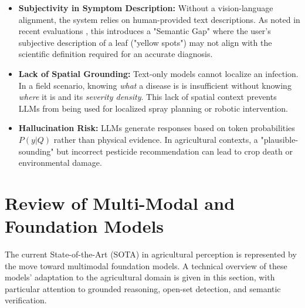 \begin{itemize}
	\item \textbf{Subjectivity in Symptom Description:} Without a vision-language alignment, the system relies on human-provided text descriptions. As noted in recent evaluations \cite{kasneci2023chatgpt}, this introduces a "Semantic Gap" where the user's subjective description of a leaf ("yellow spots") may not align with the scientific definition required for an accurate diagnosis.
	\item \textbf{Lack of Spatial Grounding:} Text-only models cannot localize an infection. In a field scenario, knowing \textit{what} a disease is is insufficient without knowing \textit{where} it is and its \textit{severity density}. This lack of spatial context prevents LLMs from being used for localized spray planning or robotic intervention.
	\item \textbf{Hallucination Risk:} LLMs generate responses based on token probabilities $P(y|Q)$ rather than physical evidence. In agricultural contexts, a "plausible-sounding" but incorrect pesticide recommendation can lead to crop death or environmental damage.
\end{itemize}

\section{Review of Multi-Modal and Foundation Models}

The current State-of-the-Art (SOTA) in agricultural perception is represented by the move toward multimodal foundation models. A technical overview of these models' adaptation to the agricultural domain is given in this section, with particular attention to grounded reasoning, open-set detection, and semantic verification.
%
